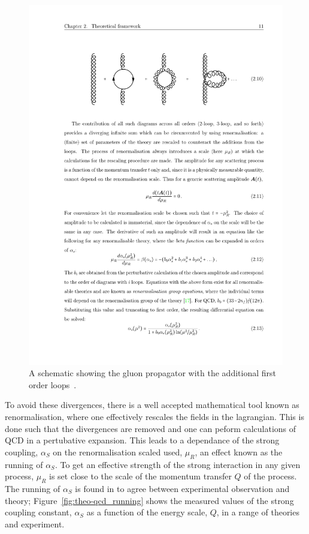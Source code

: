 \begin{figure}[!hbt]
  \begin{center}
    \includegraphics[width=0.7\linewidth, angle=0]{figs/Theory/qcd_gluon_loop.pdf}
  \end{center}
  \caption[A schematic showing the gluon propagator with the additional first order loops.]
  {A schematic showing the gluon propagator with the additional first order loops~\cite{det-thesis_kate}.}
  \label{fig:theo-qcd_gluon}
\end{figure}

To avoid these divergences, there is a well accepted mathematical tool known as renormalisation,
where one effectively rescales the fields in the lagrangian.
This is done such that the divergences are removed
and one can peform calculations of QCD in a pertubative expansion.
This leads to a dependance of the strong coupling, $\alpha_S$ on the renormalisation scaled used, $\mu_R$,
an effect known as the running of $\alpha_S$.
To get an effective strength of the strong interaction in any given process,
$\mu_R$ is set close to the scale of the momentum transfer $Q$ of the process.%
The running of $\alpha_S$ is found in to agree between experimental observation and theory;
Figure~\ref{fig:theo-qcd_running} shows the measured values of
the strong coupling constant, $\alpha_S$ as a function of the energy scale, $Q$, in a range of theories and experiment.

